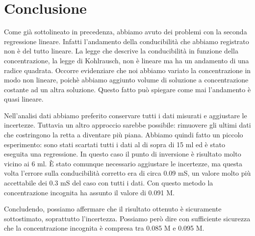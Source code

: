 \section*{Conclusione}

Come già sottolineato in precedenza, abbiamo avuto dei problemi con la seconda regressione lineare.
Infatti l'andamento della conducibilità che abbiamo registrato non è del tutto lineare. La legge che descrive
la conducibilità in funzione della concentrazione, la legge di Kohlrausch, non è lineare ma ha un andamento di una radice quadrata.
Occorre evidenziare che noi abbiamo variato la concentrazione in modo non lineare, poichè abbiamo aggiunto volume di
soluzione a concentrazione costante ad un altra soluzione. Questo fatto può spiegare come mai l'andamento è quasi lineare.

Nell'analisi dati abbiamo preferito conservare tutti i dati misurati e aggiustare le incertezze. Tuttavia un altro approccio
sarebbe possibile: rimuovere gli ultimi dati che costringono la retta a diventare più piana. Abbiamo quindi fatto un piccolo esperimento:
sono stati scartati tutti i dati al di sopra di 15 ml ed è stato eseguita una regressione. In questo caso il punto di inversione
è risultato molto vicino ai 6 ml. È stato comunque necessario aggiustare le incertezze, ma questa volta l'errore sulla conducibilità corretto
era di circa 0.09 mS, un valore molto più accettabile dei 0.3 mS del caso con tutti i dati. Con questo metodo la concentrazione incognita
ha assunto il valore di 0.091 M. 

Concludendo, possiamo affermare che il risultato ottenuto è sicuramente sottostimato, soprattutto l'incertezza. Possiamo però dire con
sufficiente sicurezza che la concentrazione incognita è compresa tra 0.085 M e 0.095 M. 
